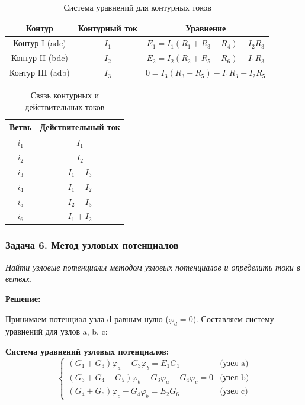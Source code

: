 \begin{table}[H]
\centering
\begin{tabular}{|c|c|c|}
\hline
\textbf{Контур} & \textbf{Контурный ток} & \textbf{Уравнение} \\
\hline
Контур I (adc) & $I_1$ & $E_1 = I_1  (R_1+R_3+R_4) - I_2R_3$ \\
\hline
Контур II (bdc) & $I_2$ & $E_2 = I_2  (R_2+R_5+R_6) - I_1R_3$ \\
\hline
Контур III (adb) & $I_3$ & $0 = I_3  (R_3+R_5) - I_1R_3 - I_2R_5$ \\
\hline
\end{tabular}
\caption{Система уравнений для контурных токов}
\label{tab:loop_current_equations}
\end{table}

\begin{table}[H]
\centering
\begin{tabular}{|c|c|}
\hline
\textbf{Ветвь} & \textbf{Действительный ток} \\
\hline
$i_1$ & $I_1$ \\
\hline
$i_2$ & $I_2$ \\
\hline
$i_3$ & $I_1 - I_3$ \\
\hline
$i_4$ & $I_1 - I_2$ \\
\hline
$i_5$ & $I_2 - I_3$ \\
\hline
$i_6$ & $I_1 + I_2$ \\
\hline
\end{tabular}
\caption{Связь контурных и действительных токов}
\label{tab:loop_to_branch_currents}
\end{table}

\subsubsection{Задача 6. Метод узловых потенциалов}
\textit{Найти узловые потенциалы методом узловых потенциалов и определить токи в ветвях.}

\textbf{Решение:}

Принимаем потенциал узла d равным нулю ($\varphi_d = 0$). Составляем систему уравнений для узлов a, b, c:

\textbf{Система уравнений узловых потенциалов:}
$$\begin{cases}
(G_1 + G_3)\varphi_a - G_3\varphi_b = E_1 G_1 & \text{(узел a)} \\
(G_3 + G_4 + G_5)\varphi_b - G_3\varphi_a - G_4\varphi_c = 0 & \text{(узел b)} \\
(G_4 + G_6)\varphi_c - G_4\varphi_b = E_2 G_6 & \text{(узел c)}
\end{cases}$$

